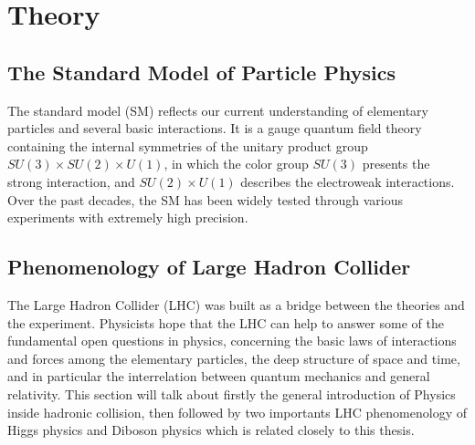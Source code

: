 
\chapter{Theory}

\section{The Standard Model of Particle Physics}
The standard model (SM) reflects our current understanding of elementary particles and several basic interactions.
It is a gauge quantum field theory containing the internal symmetries of the unitary product group $SU(3) × SU(2) × U(1)$, 
in which the color group $SU(3)$ presents the strong interaction, and $SU(2) × U(1)$ describes the electroweak interactions.
Over the past decades, the SM has been widely tested through various experiments with extremely high precision.





\section{Phenomenology of Large Hadron Collider}
The Large Hadron Collider (LHC) was built as a bridge between the theories and the experiment.
Physicists hope that the LHC can help to answer some of the fundamental open questions in physics, 
concerning the basic laws of interactions and forces among the elementary particles, 
the deep structure of space and time, and in particular the interrelation between quantum mechanics and general relativity.
This section will talk about firstly the general introduction of Physics inside hadronic collision,
then followed by two importants LHC phenomenology of Higgs physics and Diboson physics which is related closely to this thesis.




